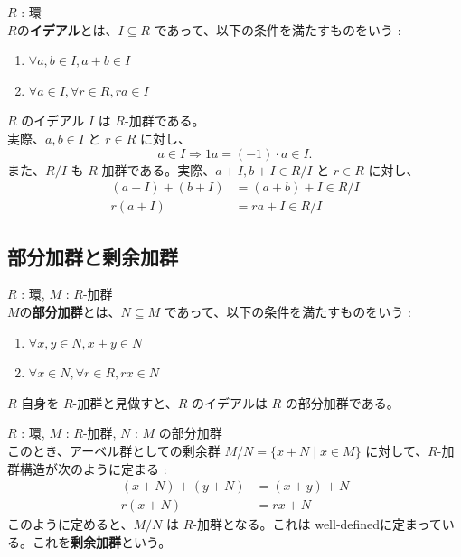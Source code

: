 \documentclass[article,paper=a4paper]{jlreq}
\begin{document}
\clearpage

\begin{dfn}
  \quad $R$ : 環\\
  $R$の\textbf{イデアル}とは、$I \subseteq R$ であって、以下の条件を満たすものをいう :
\begin{enumerate}
  \item $\forall a, b \in I, a + b \in I$
  \item $\forall a \in I, \forall r \in R, ra \in I$
\end{enumerate}
\end{dfn}

\begin{ex}
  $R$ のイデアル $I$ は $R$-加群である。\\
  実際、$a, b \in I$ と $r \in R$ に対し、
  \[a\in I \Rightarrow 1a=(-1)\cdot a\in I.\]
  また、$R/I$ も $R$-加群である。実際、$a + I, b + I \in R/I$ と $r \in R$ に対し、
  \begin{align*}
    (a + I) + (b + I) &= (a + b) + I \in R/I \\
    r(a + I) &= ra + I \in R/I
  \end{align*}
\end{ex}

\subsection{部分加群と剰余加群}

\begin{dfn}
  \quad $R$ : 環, $M$ : $R$-加群\\
  $M$の\textbf{部分加群}とは、$N \subseteq M$ であって、以下の条件を満たすものをいう :
\begin{enumerate}
  \item $\forall x, y \in N, x + y \in N$
  \item $\forall x \in N, \forall r \in R, rx \in N$
\end{enumerate} 
\end{dfn}

\begin{rem}
  $R$ 自身を $R$-加群と見做すと、$R$ のイデアルは $R$ の部分加群である。
\end{rem}

\begin{dfn}
  \quad $R$ : 環, $M$ : $R$-加群, $N$ : $M$ の部分加群\\
  このとき、アーベル群としての剰余群 $M/N = \{x + N \mid x \in M\}$ に対して、$R$-加群構造が次のように定まる :
\begin{align*}
  (x + N) + (y + N) &= (x + y) + N \\
  r(x + N) &= rx + N
\end{align*}
このように定めると、$M/N$ は $R$-加群となる。これは well-definedに定まっている。これを\textbf{剰余加群}という。
\end{dfn}
\end{document}
